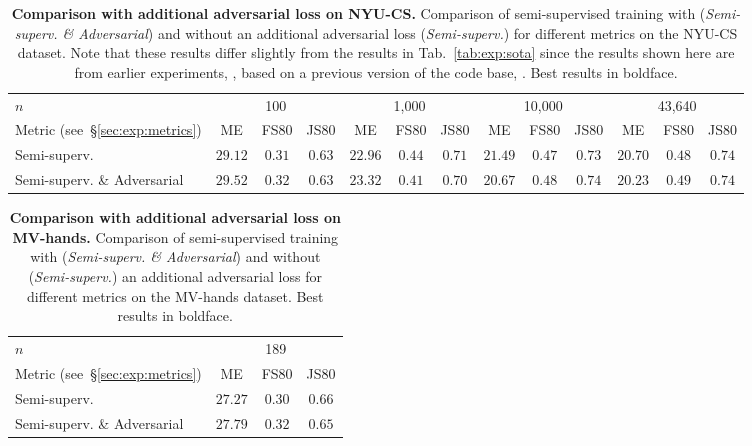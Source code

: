 \documentclass[10pt,twocolumn,letterpaper]{article}
\begin{document}
\begin{table*}[t]
\small
\begin{center}
\begin{tabular}{l c c c c c c c c c c c c}
\toprule
$n$ & \multicolumn{3}{c}{100} & \multicolumn{3}{c}{1,000} & \multicolumn{3}{c}{10,000} & \multicolumn{3}{c}{43,640} \\ 
\cmidrule(rl){2-4} \cmidrule(rl){5-7} \cmidrule(rl){8-10} \cmidrule(rl){11-13}
Metric (see~\S\ref{sec:exp:metrics}) & ME & FS80 & JS80 & ME & FS80 & JS80 & ME & FS80 & JS80 & ME & FS80 & JS80 \\ 
\midrule
Semi-superv. & $\mathbf{29.12}$ & $0.31$ & $\mathbf{0.63}$ & $\mathbf{22.96}$ & $\mathbf{0.44}$ & $\mathbf{0.71}$ & $21.49$ & $0.47$ & $0.73$ & $20.70$ & $0.48$ & $\mathbf{0.74}$ \\ 
Semi-superv. \& Adversarial & $29.52$ & $\mathbf{0.32}$ & $\mathbf{0.63}$ & $23.32$ & $0.41$ & $0.70$ & $\mathbf{20.67}$ & $\mathbf{0.48}$ & $\mathbf{0.74}$ & $\mathbf{20.23}$ & $\mathbf{0.49}$ & $\mathbf{0.74}$ \\
\bottomrule
\end{tabular}
\end{center}
\caption{\textbf{Comparison with additional adversarial loss on NYU-CS.}
  Comparison of semi-supervised training with (\emph{Semi-superv. \& Adversarial}) 
  and without an additional adversarial loss (\emph{Semi-superv.}) 
  for different metrics on the NYU-CS dataset.
  Note that these results differ slightly from the results in Tab.~\ref{tab:exp:sota} 
  since the results shown here are from earlier experiments, 
  \ie, based on a previous version of the code base, \etc.
  Best results in boldface.
  }
\label{tab:exp:sup:ganonnyu}
\end{table*}\begin{table}[t]
\begin{center}
\begin{tabular}{l c c c}
\toprule 
$n$ & \multicolumn{3}{c}{189} \\ 
\cmidrule(rl){2-4}
Metric (see~\S\ref{sec:exp:metrics}) & ME & FS80 & JS80 \\ 
\midrule
Semi-superv. & $\mathbf{27.27}$ & $0.30$ & $\mathbf{0.66}$ \\ 
Semi-superv. \& Adversarial & $27.79$ & $\mathbf{0.32}$ & $0.65$ \\ 
\bottomrule
\end{tabular}
\end{center}
\caption{\textbf{Comparison with additional adversarial loss on MV-hands.}
  Comparison of semi-supervised training with (\emph{Semi-superv. \& Adversarial}) 
  and without (\emph{Semi-superv.}) 
  an additional adversarial loss for different metrics on the MV-hands dataset.
  Best results in boldface.
  }
\label{tab:exp:sup:ganonmvhands}
\end{table}
\end{document}
